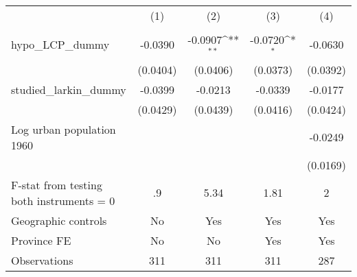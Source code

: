 {
\def\sym#1{\ifmmode^{#1}\else\(^{#1}\)\fi}
\begin{tabular}{l*{4}{c}}
\hline\hline
                &\multicolumn{1}{c}{(1)}&\multicolumn{1}{c}{(2)}&\multicolumn{1}{c}{(3)}&\multicolumn{1}{c}{(4)}\\
                &\multicolumn{1}{c}{}&\multicolumn{1}{c}{}&\multicolumn{1}{c}{}&\multicolumn{1}{c}{}\\
\hline
hypo\_LCP\_dummy  &  -0.0390         &  -0.0907\sym{**} &  -0.0720\sym{*}  &  -0.0630         \\
                & (0.0404)         & (0.0406)         & (0.0373)         & (0.0392)         \\
[1em]
studied\_larkin\_dummy&  -0.0399         &  -0.0213         &  -0.0339         &  -0.0177         \\
                & (0.0429)         & (0.0439)         & (0.0416)         & (0.0424)         \\
[1em]
Log urban population 1960&                  &                  &                  &  -0.0249         \\
                &                  &                  &                  & (0.0169)         \\
\hline
F-stat from testing both instruments = 0&       .9         &     5.34         &     1.81         &        2         \\
Geographic controls&       No         &      Yes         &      Yes         &      Yes         \\
Province FE     &       No         &       No         &      Yes         &      Yes         \\
Observations    &      311         &      311         &      311         &      287         \\
\hline\hline
\end{tabular}
}
